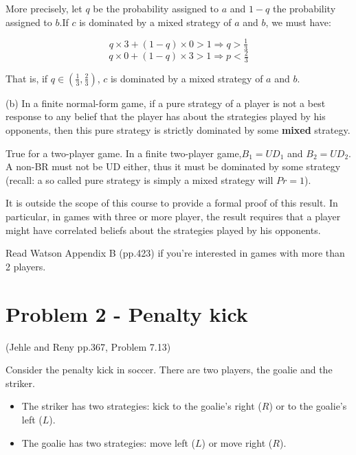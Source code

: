 \documentclass{article}
\begin{document}
\begin{mdframed}[backgroundcolor=blue!20,linecolor=white]
More precisely, let $q$ be the probability assigned to $a$ and $1-q$ the probability assigned to $b$.If ${c}$ is dominated by a mixed strategy of $a$ and $b$, we must have:

$$q\times 3 + (1-q)\times 0 > 1 \Rightarrow q > \tfrac13 $$
$$q\times 0 + (1-q)\times 3 >1 \Rightarrow p < \tfrac23 $$

That is, if $q\in (\tfrac13,\tfrac23)$, ${c}$ is dominated by a mixed strategy of $a$ and $b$.

\end{mdframed}


%
(b) In a finite normal-form game, if a pure strategy of a
player is not a best response to any belief that the player has about the strategies played by his opponents, then this pure strategy is strictly dominated by some \textbf{mixed} strategy.

\medskip

True for a two-player game. In a finite two-player game,$B_1 = UD_1$ and $B_2 = UD_2$. A non-BR must not be UD either, thus it must be dominated by some strategy (recall: a so called pure strategy is simply a mixed strategy will $Pr=1$).


\begin{mdframed}[backgroundcolor=blue!20,linecolor=white]
It is outside the scope of this course to provide a formal proof of this result. In particular, in games with three or more player, the result requires that a player might have correlated beliefs about the strategies played by his opponents.

\smallskip

Read Watson Appendix B (pp.423) if you're interested in games with more than 2 players.
\end{mdframed}

\newpage
\section{Problem 2 - Penalty kick} 

(Jehle and Reny pp.367, Problem 7.13)

Consider the penalty kick in soccer. There are two players, the goalie and the striker. 
\begin{itemize}
\item The striker has two strategies: kick to the goalie's right ($R$) or to the goalie's left ($L$). 
\item The goalie has two strategies: move left ($L$) or move right ($R$). 
\end{itemize}
\end{document}
